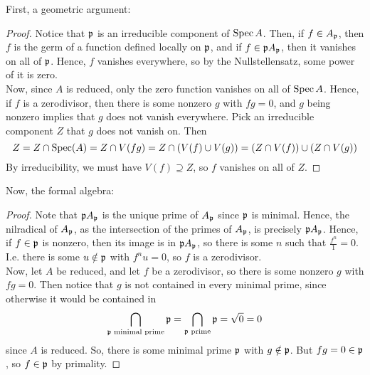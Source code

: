 
First, a geometric argument:

\begin{proof}
	Notice that $\mathfrak{p}$ is an irreducible component of $\operatorname{Spec} A$. Then, if $f \in A_{\mathfrak{p}}$, then $f$ is the germ of a function defined locally on $\mathfrak{p}$, and if $f \in \mathfrak{p} A_{\mathfrak{p}}$, then it vanishes on all of $\mathfrak{p}$. Hence, $f$ vanishes everywhere, so by the Nullstellensatz, some power of it is zero. \\
	
	Now, since $A$ is reduced, only the zero function vanishes on all of $\operatorname{Spec} A$. Hence, if $f$ is a zerodivisor, then there is some nonzero $g$ with $fg = 0$, and $g$ being nonzero implies that $g$ does not vanish everywhere. Pick an irreducible component $Z$ that $g$ does not vanish on. Then
	\[ Z = Z \cap \operatorname{Spec}(A) = Z \cap V(fg) = Z \cap (V(f) \cup V(g)) = (Z \cap V(f)) \cup (Z \cap V(g)) \]
	By irreducibility, we must have $V(f) \supseteq Z$, so $f$ vanishes on all of $Z$.
\end{proof}

Now, the formal algebra:
 
\begin{proof}
	Note that $\mathfrak{p} A_{\mathfrak{p}}$ is the unique prime of $A_{\mathfrak{p}}$ since $\mathfrak{p}$ is minimal. Hence, the nilradical of $A_{\mathfrak{p}}$, as the intersection of the primes of $A_{\mathfrak{p}}$, is precisely $\mathfrak{p} A_{\mathfrak{p}}$. Hence, if $f \in \mathfrak{p}$ is nonzero, then its image is in $\mathfrak{p} A_{\mathfrak{p}}$, so there is some $n$ such that $\frac{f^n}{1} = 0$. I.e. there is some $u \notin \mathfrak{p}$ with $f^nu = 0$, so $f$ is a zerodivisor. \\
	
	Now, let $A$ be reduced, and let $f$ be a zerodivisor, so there is some nonzero $g$ with $fg = 0$. Then notice that $g$ is not contained in every minimal prime, since otherwise it would be contained in
	\[ \bigcap_{\mathfrak{p} \text{ minimal prime}} \mathfrak{p} = \bigcap_{\mathfrak{p} \text{ prime}} \mathfrak{p} = \sqrt{0} = 0 \]
	since $A$ is reduced. So, there is some minimal prime $\mathfrak{p}$ with $g \notin \mathfrak{p}$. But $fg = 0 \in \mathfrak{p}$, so $f \in \mathfrak{p}$ by primality.
\end{proof}
